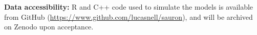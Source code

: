 \documentclass[12pt]{article}
\begin{document}
\textbf{Data accessibility:} R and C++ code used to simulate the models
is available from GitHub (\url{https://www.github.com/lucasnell/sauron}),
and will be archived on Zenodo upon acceptance.



\clearpage


\doublespacing






























\end{document}
